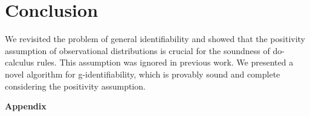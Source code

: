 \documentclass[accepted]{uai2022}
\begin{document}
\section{Conclusion}
    We revisited the problem of general identifiability and showed that the positivity assumption of observational distributions is crucial for the soundness of do-calculus rules.
    This assumption was ignored in previous work. 
    We presented a novel algorithm for g-identifiability, which is provably sound and complete considering the positivity assumption.



\onecolumn
\appendix
\begin{center}
    \bfseries\Large Appendix
\end{center}
\end{document}
